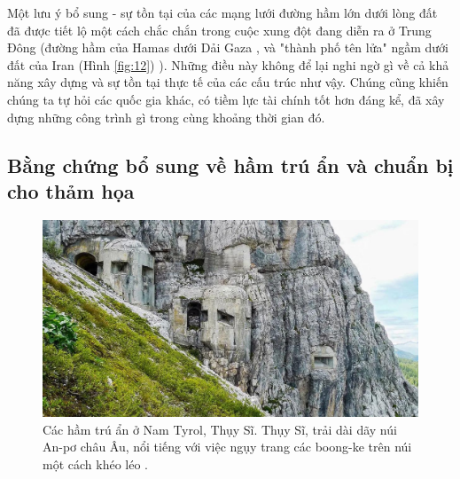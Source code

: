 \documentclass[10pt,twocolumn,letterpaper]{article}
\begin{document}
Một lưu ý bổ sung - sự tồn tại của các mạng lưới đường hầm lớn dưới lòng đất đã được tiết lộ một cách chắc chắn trong cuộc xung đột đang diễn ra ở Trung Đông (đường hầm của Hamas dưới Dải Gaza \cite{38}, và "thành phố tên lửa" ngầm dưới đất của Iran (Hình \ref{fig:12}) \cite{39,40}). Những điều này không để lại nghi ngờ gì về cả khả năng xây dựng và sự tồn tại thực tế của các cấu trúc như vậy. Chúng cũng khiến chúng ta tự hỏi các quốc gia khác, có tiềm lực tài chính tốt hơn đáng kể, đã xây dựng những công trình gì trong cùng khoảng thời gian đó.

\subsection{Bằng chứng bổ sung về hầm trú ẩn và chuẩn bị cho thảm họa}

\begin{figure}[t]
\begin{center}
   \includegraphics[width=1\linewidth]{tyrol.jpg}
\end{center}
   \caption{Các hầm trú ẩn ở Nam Tyrol, Thụy Sĩ. Thụy Sĩ, trải dài dãy núi An-pơ châu Âu, nổi tiếng với việc ngụy trang các boong-ke trên núi một cách khéo léo \cite{32}.}
\label{fig:7}
\label{fig:onecol}
\end{figure}
\end{document}
